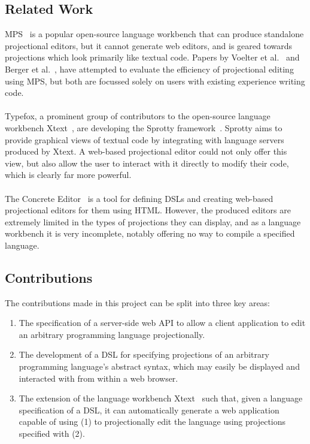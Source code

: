 \documentclass{article}
\begin{document}
\subsection{Related Work}
MPS~\cite{mps} is a popular open-source language workbench that can produce standalone projectional editors, but it cannot generate web editors, and is geared towards projections which look primarily like textual code. Papers by Voelter et al.~\cite{towardsUserFriendlyProjEditors} and Berger et al.~\cite{projEditControlledExperiment}, have attempted to evaluate the efficiency of projectional editing using MPS, but both are focussed solely on users with existing experience writing code.  
\\
\\
Typefox, a prominent group of contributors to the open-source language workbench Xtext~\cite{xtext}, are developing the Sprotty framework~\cite{sprotty}. Sprotty aims to provide graphical views of textual code by integrating with language servers produced by Xtext. A web-based projectional editor could not only offer this view, but also allow the user to interact with it directly to modify their code, which is clearly far more powerful.
\\
\\
The Concrete Editor~\cite{concrete} is a tool for defining DSLs and creating web-based projectional editors for them using HTML. However, the produced editors are extremely limited in the types of projections they can display, and as a language workbench it is very incomplete, notably offering no way to compile a specified language.

\subsection{Contributions}
The contributions made in this project can be split into three key areas:

\begin{enumerate}
\item The specification of a server-side web API to allow a client application to edit an arbitrary programming language projectionally.
\item The development of a DSL for specifying projections of an arbitrary programming language's abstract syntax, which may easily be displayed and interacted with from within a web browser.
\item The extension of the language workbench Xtext~\cite{xtext} such that, given a language specification of a DSL, it can automatically generate a web application capable of using (1) to projectionally edit the language using projections specified with (2).
\end{enumerate}
\end{document}

